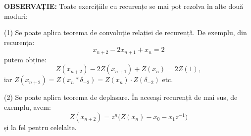 \documentclass[12pt,a4paper]{article}
\theoremstyle{dotless}
\theoremstyle{dotlessdr}
\begin{document}
\textbf{OBSERVAȚIE:} Toate exercițiile cu recurențe se mai pot rezolva în alte
două moduri:

(1) Se poate aplica teorema de convoluție relației de recurență. De exemplu,
din recurența:
\[
  x_{n + 2} - 2x_{n + 1} + x_n = 2
\]
putem obține:
\[
  Z(x_{n+2}) - 2Z(x_{n + 1}) + Z(x_n) = 2Z(1),
\]
iar $ Z(x_{n+2}) = Z(x_n \ast \delta_{-2}) = Z(x_n) \cdot Z(\delta_{-2}) $ etc.

(2) Se poate aplica teorema de deplasare. În aceeași recurență de mai sus,
de exemplu, avem:
\[
  Z(x_{n+2}) = z^n \Big( Z(x_n) - x_0 - x_1 z^{-1} \Big)
\]
și la fel pentru celelalte.
\end{document}
